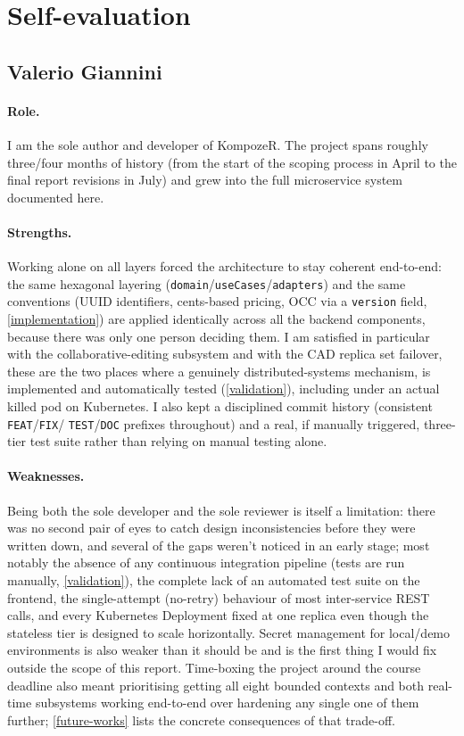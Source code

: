 \section{Self-evaluation}\label{self-evaluation}

\subsection{Valerio Giannini}\label{self-evaluation-valerio}

\paragraph{Role.} I am the sole author and developer of KompozeR.
The project spans roughly three/four months of
history (from the start of the scoping process in April to the final report
revisions in July) and grew into the full microservice system
documented here.

\paragraph{Strengths.} Working alone on all layers forced the architecture
to stay coherent end-to-end: the same hexagonal layering
(\texttt{domain}/\texttt{useCases}/\texttt{adapters}) and the same
conventions (UUID identifiers, cents-based pricing, OCC via a
\texttt{version} field, \cref{implementation}) are applied identically
across all the backend components, because there was only one person
deciding them. I am satisfied in particular with the collaborative-editing
subsystem and with the CAD replica set failover,
these are the two places where a genuinely distributed-systems mechanism,
is implemented and automatically tested
(\cref{validation}), including under an actual killed pod on Kubernetes. I
also kept a disciplined commit history (consistent \texttt{FEAT}/\texttt{FIX}/
\texttt{TEST}/\texttt{DOC} prefixes throughout) and a real, if manually
triggered, three-tier test suite rather than relying on manual testing alone.

\paragraph{Weaknesses.} Being both the sole developer and the sole reviewer
is itself a limitation: there was no second pair of eyes to catch design
inconsistencies before they were written down, and several of the gaps
weren't noticed in an early stage; most notably the absence of any continuous
integration pipeline (tests are run manually, \cref{validation}), the
complete lack of an automated test suite on the frontend, the single-attempt
(no-retry) behaviour of most inter-service REST calls, and every Kubernetes
Deployment fixed at one replica even though the stateless tier is designed
to scale horizontally. Secret management for local/demo environments is
also weaker than it should be and is the first thing I would fix outside the
scope of this report. Time-boxing the project around the course deadline
also meant prioritising getting all eight bounded contexts and
both real-time subsystems working end-to-end over hardening any single
one of them further; \cref{future-works} lists the concrete consequences of
that trade-off.

